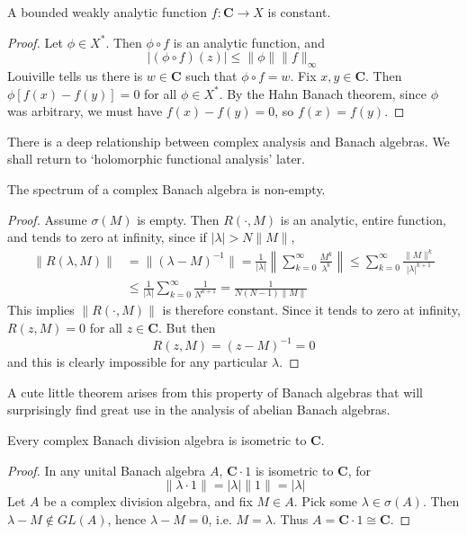 \begin{theorem}
    A bounded weakly analytic function $f: \mathbf{C} \to X$ is constant.
\end{theorem}
\begin{proof}
    Let $\phi \in X^*$. Then $\phi \circ f$ is an analytic function, and
    \[ | (\phi \circ f)(z) | \leq \| \phi \| \| f \|_\infty \]
    Louiville tells us there is $w \in \mathbf{C}$ such that $\phi \circ f = w$. Fix $x,y \in \mathbf{C}$. Then $\phi[f(x) - f(y)] = 0$ for all $\phi \in X^*$. By the Hahn Banach theorem, since $\phi$ was arbitrary, we must have $f(x) - f(y) = 0$, so $f(x) = f(y)$.
\end{proof}

There is a deep relationship between complex analysis and Banach algebras. We shall return to `holomorphic functional analysis' later.

\begin{theorem}
    The spectrum of a complex Banach algebra is non-empty.
\end{theorem}
\begin{proof}
    Assume $\sigma(M)$ is empty. Then $R(\cdot, M)$ is an analytic, entire function, and tends to zero at infinity, since if $|\lambda| > N \| M \|$,
    \begin{align*}
        \| R(\lambda, M) \| &= \| (\lambda - M)^{-1} \| = \frac{1}{|\lambda|} \left\| \sum_{k = 0}^\infty \frac{M^k}{\lambda^k} \right\| \leq \sum_{k = 0}^\infty \frac{\| M \|^k}{|\lambda|^{k+1}}\\
        &\leq \frac{1}{|\lambda|} \sum_{k = 0}^\infty \frac{1}{N^{k+1}} = \frac{1}{N(N - 1)\|M\|}
    \end{align*}
    This implies $\| R(\cdot, M) \|$ is therefore constant. Since it tends to zero at infinity, $R(z, M) = 0$ for all $z \in \mathbf{C}$. But then
    \[ R(z, M) = (z - M)^{-1} = 0 \]
    and this is clearly impossible for any particular $\lambda$.
\end{proof}

A cute little theorem arises from this property of Banach algebras that will surprisingly find great use in the analysis of abelian Banach algebras.

\begin{corollary}
    Every complex Banach division algebra is isometric to $\mathbf{C}$.
\end{corollary}
\begin{proof}
    In any unital Banach algebra $A$, $\mathbf{C} \cdot 1$ is isometric to $\mathbf{C}$, for
    \[ \| \lambda \cdot 1 \| = |\lambda| \| 1 \| = |\lambda| \]
    Let $A$ be a complex division algebra, and fix $M \in A$. Pick some $\lambda \in \sigma(A)$. Then $\lambda - M \not \in GL(A)$, hence $\lambda - M = 0$, i.e. $M = \lambda$. Thus $A = \mathbf{C} \cdot 1 \cong \mathbf{C}$.
\end{proof}

